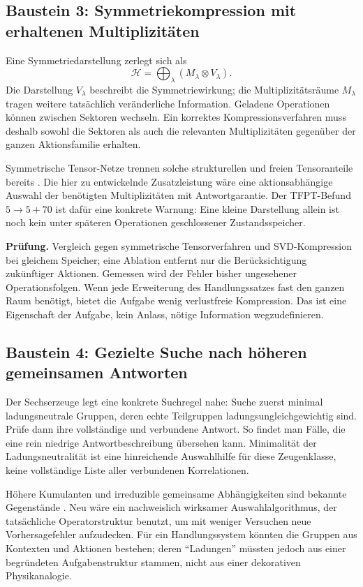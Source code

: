 \subsection{Baustein 3: Symmetriekompression mit erhaltenen Multiplizitäten}
Eine Symmetriedarstellung zerlegt sich als
\begin{equation}
\mathcal H=\bigoplus_\lambda(M_\lambda\otimes V_\lambda).
\end{equation}
Die Darstellung $V_\lambda$ beschreibt die Symmetriewirkung; die Multiplizitätsräume $M_\lambda$ tragen weitere tatsächlich veränderliche Information. Geladene Operationen können zwischen Sektoren wechseln. Ein korrektes Kompressionsverfahren muss deshalb sowohl die Sektoren als auch die relevanten Multiplizitäten gegenüber der ganzen Aktionsfamilie erhalten.

Symmetrische Tensor-Netze trennen solche strukturellen und freien Tensoranteile bereits \cite{singh,singhvidal}. Die hier zu entwickelnde Zusatzleistung wäre eine aktionsabhängige Auswahl der benötigten Multiplizitäten mit Antwortgarantie. Der TFPT-Befund $5\to5+70$ ist dafür eine konkrete Warnung: Eine kleine Darstellung allein ist noch kein unter späteren Operationen geschlossener Zustandsspeicher.

\textbf{Prüfung.} Vergleich gegen symmetrische Tensorverfahren und SVD-Kompression bei gleichem Speicher; eine Ablation entfernt nur die Berücksichtigung zukünftiger Aktionen. Gemessen wird der Fehler bisher ungesehener Operationsfolgen. Wenn jede Erweiterung des Handlungssatzes fast den ganzen Raum benötigt, bietet die Aufgabe wenig verlustfreie Kompression. Das ist eine Eigenschaft der Aufgabe, kein Anlass, nötige Information wegzudefinieren.

\subsection{Baustein 4: Gezielte Suche nach höheren gemeinsamen Antworten}
Der Sechserzeuge legt eine konkrete Suchregel nahe: Suche zuerst minimal ladungsneutrale Gruppen, deren echte Teilgruppen ladungsungleichgewichtig sind. Prüfe dann ihre vollständige und verbundene Antwort. So findet man Fälle, die eine rein niedrige Antwortbeschreibung übersehen kann. Minimalität der Ladungsneutralität ist eine hinreichende Auswahlhilfe für diese Zeugenklasse, keine vollständige Liste aller verbundenen Korrelationen.

Höhere Kumulanten und irreduzible gemeinsame Abhängigkeiten sind bekannte Gegenstände \cite{domino,schneidman2003}. Neu wäre ein nachweislich wirksamer Auswahlalgorithmus, der tatsächliche Operatorstruktur benutzt, um mit weniger Versuchen neue Vorhersagefehler aufzudecken. Für ein Handlungssystem könnten die Gruppen aus Kontexten und Aktionen bestehen; deren ``Ladungen'' müssten jedoch aus einer begründeten Aufgabenstruktur stammen, nicht aus einer dekorativen Physikanalogie.

